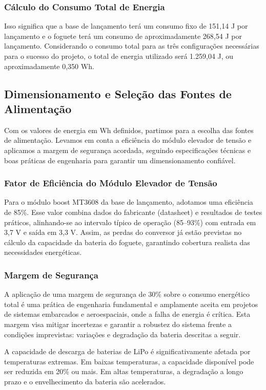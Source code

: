 \subsubsection{Cálculo do Consumo Total de Energia}

Isso significa que a base de lançamento terá um consumo fixo de 151,14 J por lançamento e o foguete terá um consumo de aproximadamente 268,54 J por lançamento. Considerando o consumo total para as três configurações necessárias para o sucesso do projeto, o total de energia utilizado será 1.259,04 J, ou aproximadamente 0,350 Wh. 

\subsection{Dimensionamento e Seleção das Fontes de Alimentação}

Com os valores de energia em Wh definidos, partimos para a escolha das fontes de alimentação. Levamos em conta a eficiência do módulo elevador de tensão e aplicamos a margem de segurança acordada, seguindo especificações técnicas e boas práticas de engenharia para garantir um dimensionamento confiável.

\subsubsection{Fator de Eficiência do Módulo Elevador de Tensão}
Para o módulo boost MT3608 da base de lançamento, adotamos uma eficiência de 85\%. Esse valor combina dados do fabricante (datasheet) e resultados de testes práticos, alinhando-se ao intervalo típico de operação (85–93\%) com entrada em 3,7 V e saída em 3,3 V. Assim, as perdas do conversor já estão previstas no cálculo da capacidade da bateria do foguete, garantindo cobertura realista das necessidades energéticas.

\subsubsection{Margem de Segurança}

A aplicação de uma margem de segurança de 30\% sobre o consumo energético total é uma prática de engenharia fundamental e amplamente aceita em projetos de sistemas embarcados e aeroespaciais, onde a falha de energia é crítica. Esta margem visa mitigar incertezas e garantir a robustez do sistema frente a condições imprevistas: variações e degradação da bateria descritas a seguir.

A capacidade de descarga de baterias de LiPo é significativamente afetada por temperaturas extremas. Em baixas temperaturas, a capacidade disponível pode ser reduzida em 20\% ou mais. Em altas temperaturas, a degradação a longo prazo e o envelhecimento da bateria são acelerados.\cite{plett2015}

